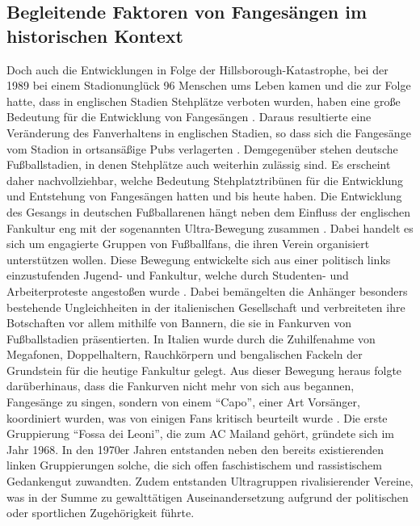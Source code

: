 \subsection{Begleitende Faktoren von Fangesängen im historischen Kontext}
Doch auch die Entwicklungen in Folge der Hillsborough-Katastrophe, bei der 1989 bei einem Stadionunglück 96 Menschen ums Leben kamen und die zur Folge hatte, dass in englischen Stadien Stehplätze verboten wurden, haben eine große Bedeutung für die Entwicklung von Fangesängen \cite[S. 29]{JK07}.
Daraus resultierte eine Veränderung des Fanverhaltens in englischen Stadien, so dass sich die Fangesänge vom Stadion in ortsansäßige Pubs verlagerten \cite{MMQ14}.
Demgegenüber stehen deutsche Fußballstadien, in denen Stehplätze auch weiterhin zulässig sind.
Es erscheint daher nachvollziehbar, welche Bedeutung Stehplatztribünen für die Entwicklung und Entstehung von Fangesängen hatten und bis heute haben.
Die Entwicklung des Gesangs in deutschen Fußballarenen hängt neben dem Einfluss der englischen Fankultur eng mit der sogenannten Ultra-Bewegung zusammen \cite[S. 30]{JK07}.
Dabei handelt es sich um engagierte Gruppen von Fußballfans, die ihren Verein organisiert unterstützen wollen.
Diese Bewegung entwickelte sich aus einer politisch links einzustufenden Jugend- und Fankultur, welche durch Studenten- und Arbeiterproteste angestoßen wurde \cite[S. 27]{MS12}.
Dabei bemängelten die Anhänger besonders bestehende Ungleichheiten in der italienischen Gesellschaft und verbreiteten ihre Botschaften vor allem mithilfe von Bannern, die sie in Fankurven von Fußballstadien präsentierten.
In Italien wurde durch die Zuhilfenahme von Megafonen, Doppelhaltern, Rauchkörpern und bengalischen Fackeln der Grundstein für die heutige Fankultur gelegt.
Aus dieser Bewegung heraus folgte darüberhinaus, dass die Fankurven nicht mehr von sich aus begannen, Fangesänge zu singen, sondern von einem "`Capo"', einer Art Vorsänger, koordiniert wurden, was von einigen Fans kritisch beurteilt wurde \cite[S. 30]{JK07}.
Die erste Gruppierung "`Fossa dei Leoni"', die zum AC Mailand gehört, gründete sich im Jahr 1968.
In den 1970er Jahren entstanden neben den bereits existierenden linken Gruppierungen solche, die sich offen faschistischem und rassistischem Gedankengut zuwandten.
Zudem entstanden Ultragruppen rivalisierender Vereine, was in der Summe zu gewalttätigen Auseinandersetzung aufgrund der politischen oder sportlichen Zugehörigkeit führte.

